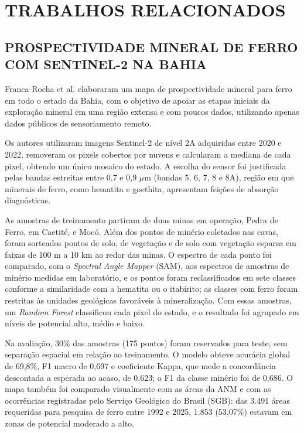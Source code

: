 \chapter{TRABALHOS RELACIONADOS}
\label{chap:trabalhos-relacionados}

\section{PROSPECTIVIDADE MINERAL DE FERRO COM SENTINEL-2 NA BAHIA}

Franca-Rocha et al. \cite{francarocha2025} elaboraram um mapa de prospectividade mineral para ferro em todo o estado da Bahia, com o objetivo de apoiar as etapas iniciais da exploração mineral em uma região extensa e com poucos dados, utilizando apenas dados públicos de sensoriamento remoto.

Os autores utilizaram imagens Sentinel-2 de nível 2A adquiridas entre 2020 e 2022, removeram os pixels cobertos por nuvens e calcularam a mediana de cada pixel, obtendo um único mosaico do estado. A escolha do sensor foi justificada pelas bandas estreitas entre 0,7 e 0,9 $\mu$m (bandas 5, 6, 7, 8 e 8A), região em que minerais de ferro, como hematita e goethita, apresentam feições de absorção diagnósticas.

As amostras de treinamento partiram de duas minas em operação, Pedra de Ferro, em Caetité, e Mocó. Além dos pontos de minério coletados nas cavas, foram sorteados pontos de solo, de vegetação e de solo com vegetação esparsa em faixas de 100 m a 10 km ao redor das minas. O espectro de cada ponto foi comparado, com o \textit{Spectral Angle Mapper} (SAM), aos espectros de amostras de minério medidas em laboratório, e os pontos foram reclassificados em sete classes conforme a similaridade com a hematita ou o itabirito; as classes com ferro foram restritas às unidades geológicas favoráveis à mineralização. Com essas amostras, um \textit{Random Forest} classificou cada pixel do estado, e o resultado foi agrupado em níveis de potencial alto, médio e baixo.

Na avaliação, 30\% das amostras (175 pontos) foram reservados para teste, sem separação espacial em relação ao treinamento. O modelo obteve acurácia global de 69,8\%, F1 macro de 0,697 e coeficiente Kappa, que mede a concordância descontada a esperada ao acaso, de 0,623; o F1 da classe minério foi de 0,686. O mapa também foi comparado visualmente com as áreas da ANM e com as ocorrências registradas pelo Serviço Geológico do Brasil (SGB): das 3.491 áreas requeridas para pesquisa de ferro entre 1992 e 2025, 1.853 (53,07\%) estavam em zonas de potencial moderado a alto.

